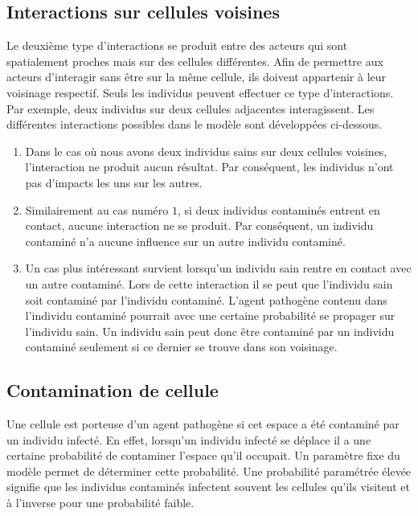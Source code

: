 \subsection{Interactions sur cellules voisines}

Le deuxième type d'interactions se produit entre des acteurs qui sont spatialement proches mais sur des cellules différentes. Afin de permettre aux acteurs d'interagir sans être sur la même cellule, ils doivent appartenir à leur voisinage respectif. Seuls les individus peuvent effectuer ce type d'interactions. Par exemple, deux individus sur deux cellules adjacentes interagissent. Les différentes interactions possibles dans le modèle sont développées ci-dessous.

\begin{enumerate}
	\item Dans le cas où nous avons deux individus sains sur deux cellules voisines, l'interaction ne produit aucun résultat. Par conséquent, les individus n'ont pas d’impacts les uns sur les autres.
	\item Similairement au cas numéro $1$, si deux individus contaminés entrent en contact, aucune interaction ne se produit. Par conséquent, un individu contaminé n'a aucune influence sur un autre individu contaminé.
	\item Un cas plus intéressant survient lorsqu'un individu sain rentre en contact avec un autre contaminé. Lors de cette interaction il se peut que l'individu sain soit contaminé par l'individu contaminé. L'agent pathogène contenu dans l'individu contaminé pourrait avec une certaine probabilité se propager sur l'individu sain. Un individu sain peut donc être contaminé par un individu contaminé seulement si ce dernier se trouve dans son voisinage.
\end{enumerate}

\subsection{Contamination de cellule}

Une cellule est porteuse d'un agent pathogène si cet espace a été contaminé par un individu infecté. En effet, lorsqu’un individu infecté se déplace il a une certaine probabilité de contaminer l'espace qu'il occupait. Un paramètre fixe du modèle permet de déterminer cette probabilité. Une probabilité paramétrée élevée signifie que les individus contaminés infectent souvent les cellules qu'ils visitent et à l'inverse pour une probabilité faible.\\

